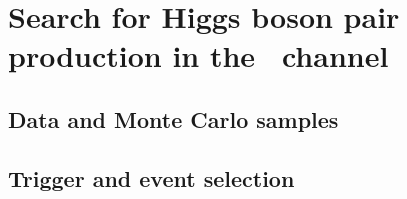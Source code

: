 \documentclass[letterpaper,12pt]{article}
\begin{document}

\newpage




\section{Search for Higgs boson pair production in the \bbtt\ channel}
\label{sec:search for dihiggs}
\subsection{Data and Monte Carlo samples}
\subsection{Trigger and event selection}
\end{document}
